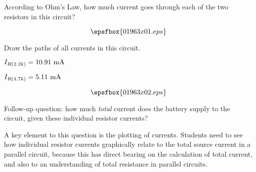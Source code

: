 

According to Ohm's Law, how much current goes through each of the two resistors in this circuit?

$$\epsfbox{01963x01.eps}$$

Draw the paths of all currents in this circuit.







$I_{R(2.2k)} = 10.91 \hbox{ mA}$

$I_{R(4.7k)} = 5.11 \hbox{ mA}$

$$\epsfbox{01963x02.eps}$$

Follow-up question: how much {\it total} current does the battery supply to the circuit, given these individual resistor currents?







A key element to this question is the plotting of currents.  Students need to see how individual resistor currents graphically relate to the total source current in a parallel circuit, because this has direct bearing on the calculation of total current, and also to an understanding of total resistance in parallel circuits.




